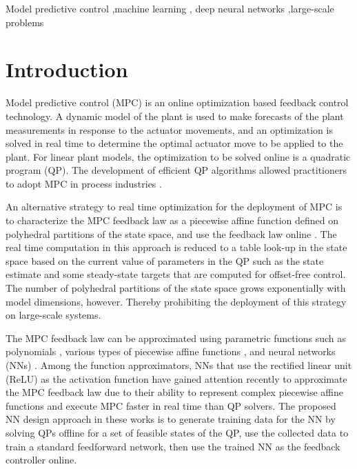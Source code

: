 \documentclass[preprint,5p, twocolumn, authoryear]{elsarticle}
\begin{document}
\begin{frontmatter}
\begin{keyword}
Model predictive control \sep machine learning \sep 
deep neural networks \sep large-scale problems
\end{keyword}

\end{frontmatter}

\section{Introduction} \label{sec:introduction}

Model predictive control (MPC) is an online 
optimization based feedback control technology. A dynamic model 
of the plant is used to make forecasts of the plant measurements
in response to the actuator movements, and an optimization
is solved in real time to determine the optimal actuator
move to be applied to the plant. For linear plant models, 
the optimization to be solved online is a quadratic program (QP).
The development 
of efficient QP algorithms 
\citep*{kouzoupis:frison:zanelli:diehl:2018, wright:2019}
allowed practitioners to adopt MPC
in process industries \citep*{qin:badgwell:2003, lahiri:2017}.

An alternative strategy to 
real time optimization for the deployment of MPC 
is to characterize the MPC feedback law
as a piecewise affine function defined on 
polyhedral partitions of the state space, 
and use the feedback law online
\citep*{bemporad:morari:dua:pistikopoulos:2002, 
seron:goodwin:dedona:2003}.
The real time computation in this approach is 
reduced to a table look-up in the state space
based on the current value of parameters 
in the QP such as the state estimate and some 
steady-state targets that are computed for 
offset-free control. The number of polyhedral 
partitions of the state space grows exponentially
with model dimensions, however. Thereby prohibiting 
the deployment of this strategy on large-scale 
systems.

The MPC feedback law can be approximated using 
parametric functions such as polynomials
\citep*{kvasnica:lofberg:fikar:2011}, 
various types of piecewise affine functions
\citep*{bemporad:oliveri:poggi:storace:2011, wen:ma:ydstie:2009},
and neural networks (NNs) \citep*{cavagnari:magni:scattolini:1999}.
Among the
function approximators, NNs that use the rectified linear unit 
(ReLU) as the activation function 
have gained attention recently 
\citep*{chen:saulnier:atanasov:lee:kumar:pappas:morari:2018, 
karg:lucia:2020, paulson:mesbah:2020, lovelett:dietrich:lee:kevrekidis:2020}
to approximate
the MPC feedback law due to their ability to represent complex 
piecewise affine functions
\citep*{montufar:pascanu:cho:bengio:2014}
and execute MPC faster in real time than QP solvers. 
The proposed NN design approach in 
these works is to generate training 
data for the NN by solving QPs offline
for a set of feasible states of the QP, use the
collected data to train a standard feedforward network, then 
use the trained NN as the feedback controller online.
\end{document}
